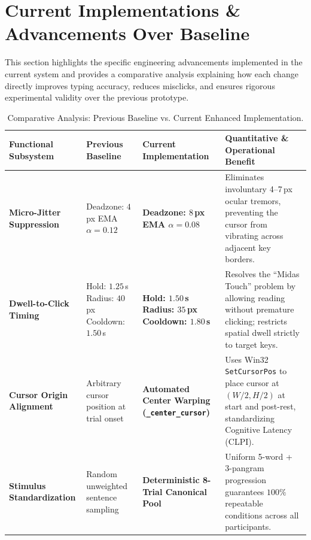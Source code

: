 \documentclass[11pt,a4paper]{article}
\begin{document}
\section{Current Implementations \& Advancements Over Baseline}

This section highlights the specific engineering advancements implemented in the current system and provides a comparative analysis explaining how each change directly improves typing accuracy, reduces misclicks, and ensures rigorous experimental validity over the previous prototype.

\begin{table}[H]
\centering
\caption{Comparative Analysis: Previous Baseline vs. Current Enhanced Implementation.}
\small
\begin{tabularx}{\textwidth}{p{} p{} p{} X}
\toprule
\textbf{Functional Subsystem} & \textbf{Previous Baseline} & \textbf{Current Implementation} & \textbf{Quantitative \& Operational Benefit} \\
\midrule
\textbf{Micro-Jitter Suppression} & Deadzone: $4$\,px \newline EMA $\alpha = 0.12$ & \textbf{Deadzone: $8$\,px} \newline \textbf{EMA $\alpha = 0.08$} & Eliminates involuntary 4--7\,px ocular tremors, preventing the cursor from vibrating across adjacent key borders. \\
\midrule
\textbf{Dwell-to-Click Timing} & Hold: $1.25$\,s \newline Radius: $40$\,px \newline Cooldown: $1.50$\,s & \textbf{Hold: $1.50$\,s} \newline \textbf{Radius: $35$\,px} \newline \textbf{Cooldown: $1.80$\,s} & Resolves the ``Midas Touch'' problem by allowing reading without premature clicking; restricts spatial dwell strictly to target keys. \\
\midrule
\textbf{Cursor Origin Alignment} & Arbitrary cursor position at trial onset & \textbf{Automated Center Warping (\texttt{\_center\_cursor})} & Uses Win32 \texttt{SetCursorPos} to place cursor at $(W/2, H/2)$ at start and post-rest, standardizing Cognitive Latency (CLPI). \\
\midrule
\textbf{Stimulus Standardization} & Random unweighted sentence sampling & \textbf{Deterministic 8-Trial Canonical Pool} & Uniform 5-word + 3-pangram progression guarantees $100\%$ repeatable conditions across all participants. \\

\end{tabularx}
\end{table}
\end{document}
